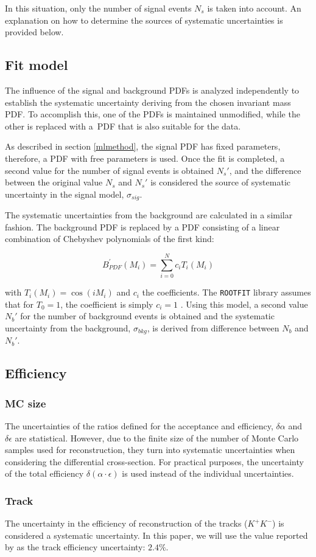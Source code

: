 In this situation, only the number of signal events $N_s$ is taken into account. An explanation on how to determine the sources of systematic uncertainties is provided below. 

\subsection{Fit model}

The influence of the signal and background PDFs is analyzed independently to establish the systematic uncertainty deriving from the chosen invariant mass PDF. To accomplish this, one of the PDFs is maintained unmodified, while the other is replaced with a PDF that is also suitable for the data.

As described in section \ref{mlmethod}, the signal PDF has fixed parameters, therefore, a PDF with free parameters is used. Once the fit is completed, a second value for the number of signal events is obtained $N_s'$, and the difference between the original value $N_s$ and $N_s'$ is considered the source of systematic uncertainty in the signal model, $\sigma_{sig}$.

The systematic uncertainties from the background are calculated in a similar fashion. The background PDF is replaced by a PDF consisting of a linear combination of Chebyshev polynomials of the first kind:

\begin{equation}
	B_{PDF}^{'}(M_i) = \sum_{i=0}^{N} c_i T_i(M_i) 
\end{equation}

with \cite{mason2002chebyshev} $T_i(M_i) = \cos(iM_i)$ and $c_i$ the coefficients. The \verb|ROOTFIT| library assumes that for $T_0 = 1$, the coefficient is simply $c_i = 1$ \cite{chebyshev}. Using this model, a second value $N_b'$ for the number of background events is obtained and the systematic uncertainty from the background, $\sigma_{bkg}$, is derived from difference between $N_b$ and $N_b'$.
\subsection{Efficiency}

\subsubsection{MC size}
The uncertainties of the ratios defined for the acceptance and efficiency, $\delta \alpha$ and $\delta \epsilon$ are statistical. However, due to the finite size of the number of Monte Carlo samples used for reconstruction, they turn into systematic uncertainties when considering the differential cross-section. For practical purposes, the uncertainty of the total efficiency $\delta(\alpha \cdot \epsilon)$ is used instead of the individual uncertainties.
\subsubsection{Track}

The uncertainty in the efficiency of reconstruction of the tracks ($K^{+}K^{-}$) is considered a systematic uncertainty. In this paper, we will use the value reported by \cite{cms2018tracking} as the track efficiency uncertainty: $2.4\%$.